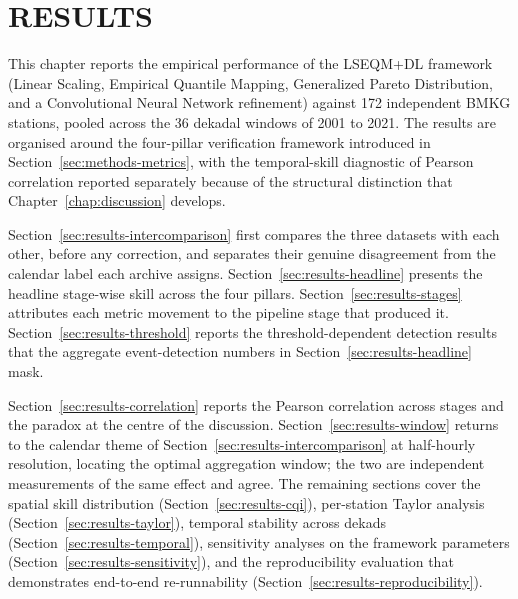 %

\chapter{RESULTS}\label{chap:results}

This chapter reports the empirical performance of the LSEQM+DL
framework (Linear Scaling, Empirical Quantile Mapping, Generalized
Pareto Distribution, and a Convolutional Neural Network refinement)
against 172 independent BMKG stations, pooled across
the 36 dekadal windows of 2001 to 2021. The results are organised
around the four-pillar verification framework introduced in
Section~\ref{sec:methods-metrics}, with the temporal-skill
diagnostic of Pearson correlation reported separately because of
the structural distinction that
Chapter~\ref{chap:discussion} develops.

Section~\ref{sec:results-intercomparison} first compares the three
datasets with each other, before any correction, and separates
their genuine disagreement from the calendar label each archive
assigns.
Section~\ref{sec:results-headline} presents the headline
stage-wise skill across the four pillars.
Section~\ref{sec:results-stages} attributes each metric movement
to the pipeline stage that produced it.
Section~\ref{sec:results-threshold} reports the
threshold-dependent detection results that the aggregate
event-detection numbers in
Section~\ref{sec:results-headline} mask.

Section~\ref{sec:results-correlation} reports the Pearson
correlation across stages and the paradox at the centre of the
discussion.
Section~\ref{sec:results-window} returns to the calendar theme of
Section~\ref{sec:results-intercomparison} at half-hourly
resolution, locating the optimal aggregation window; the two are
independent measurements of the same effect and agree. The
remaining sections cover the spatial skill
distribution (Section~\ref{sec:results-cqi}), per-station Taylor
analysis (Section~\ref{sec:results-taylor}), temporal stability
across dekads (Section~\ref{sec:results-temporal}), sensitivity
analyses on the framework parameters
(Section~\ref{sec:results-sensitivity}), and the reproducibility
evaluation that demonstrates end-to-end re-runnability
(Section~\ref{sec:results-reproducibility}).


